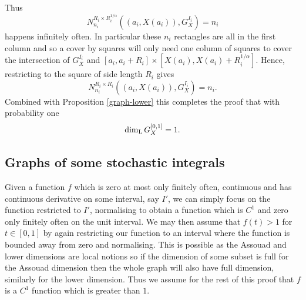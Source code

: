 Thus 
\[
N_{n_i}^{R_i \times R_i^{1/\alpha}}\left((a_i,X(a_i)), G_X^{I_i}\right) = n_i
\]
happens infinitely often. In particular these $n_i$ rectangles are all in the first column and so a cover by squares will only need one column of squares to cover the intersection of $G_X^{I_i}$ and $[a_i, a_i + R_i] \times [X(a_i), X(a_i) + R_i^{1/\alpha}]$. Hence, restricting to the square of side length $R_i$ gives
\[
N_{n_i}^{R_i \times R_i}\left((a_i,X(a_i)), G_X^{I_i}\right) = n_i.
\]
Combined with Proposition \ref{graph-lower} this completes the proof that with probability one 
\[
\dim_{\textup{L}} G_X^{[0,1]} = 1.
\]



\subsection{Graphs of some stochastic integrals}


	Given a function $f$ which is zero at most only finitely often, continuous and has continuous derivative on some interval, say $I'$, we can simply focus on the function restricted to $I'$, normalising to obtain a function which is $C^1$ and zero only finitely often on the unit interval. We may then assume that $f(t)>1$ for $t\in [0,1]$ by again restricting our function to an interval where the function is bounded away from zero and normalising. This is possible as the Assouad and lower dimensions are local notions so if the dimension of some subset is full for the Assouad dimension then the whole graph will also have full dimension, similarly for the lower dimension. Thus we assume for the rest of this proof that $f$ is a $C^1$ function which is greater than $1$.
	

